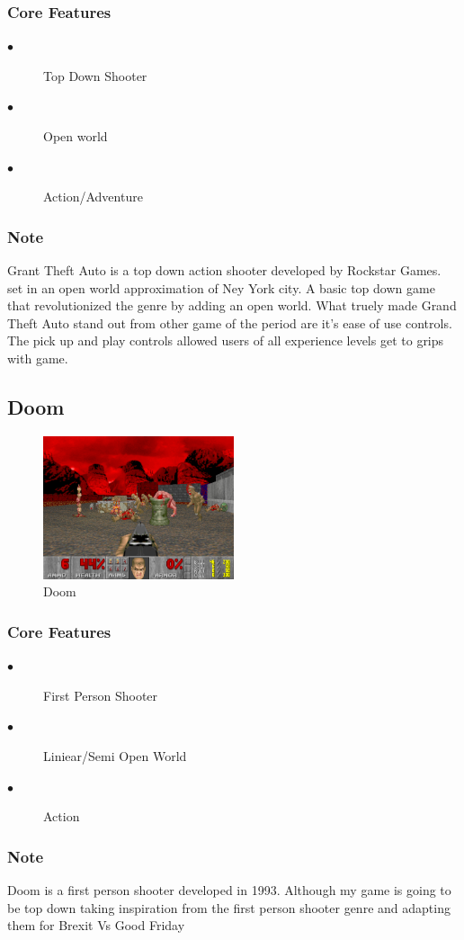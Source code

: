 \documentclass[a4paper]{scrreprt}
\begin{document}
            \subsubsection{Core Features}
                \begin{description}
                    \item[$\bullet$] Top Down Shooter
                    \item[$\bullet$] Open world
                    \item[$\bullet$] Action/Adventure
                \end{description}

                \subsubsection{Note}
                Grant Theft Auto is a top down action shooter developed by Rockstar Games. set in an open world approximation of Ney York city.
                A basic top down game that revolutionized the genre by adding an open world.
                What truely made Grand Theft Auto stand out from other game of the period are it's ease of use controls. 
                The pick up and play controls allowed users of all experience levels get to grips with game.
            
        \subsection{Doom}

            \begin{figure}[H]
                \centering
                \includegraphics[width=0.5\textwidth]{doom.png}
                \caption{\label{fig:art} Doom}
            \end{figure}

            \subsubsection{Core Features}
            \begin{description}
                \item[$\bullet$] First Person Shooter
                \item[$\bullet$] Liniear/Semi Open World
                \item[$\bullet$] Action
            \end{description}

            \subsubsection{Note}
            Doom is a first person shooter developed in 1993. Although my game is going to be top down taking inspiration from the first person shooter genre and adapting them for Brexit Vs Good Friday
\end{document}
